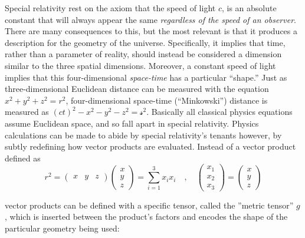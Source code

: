    Special relativity rest on the axiom that the speed of light $c$,
        is an absolute constant that will always appear the same
        \textit{regardless of the speed of an observer}.
    There are many consequences to this, but the most relevant is that
        it produces a description for the geometry of the universe.
    Specifically, it implies that time, rather than a parameter of reality,
        should instead be considered a dimension similar to the three spatial dimensions.
    Moreover, a constant speed of light implies that this four-dimensional \textit{space-time} has a particular ``shape.''
    Just as three-dimensional Euclidean distance can be measured with the equation $x^2+y^2+z^2=r^2$,
        four-dimensional space-time (``Minkowski'') distance is measured as $(ct)^2-x^2-y^2-z^2 = \mathscr{s}^2$.
    Basically all classical physics equations assume Euclidean space, and so fall apart in special relativity.
    Physics calculations can be made to abide by special relativity's tenants however,
        by subtly redefining how vector products are evaluated.
    Instead of a vector product defined as
    \begin{equation}
        r^2 = \begin{pmatrix} x & y & z\end{pmatrix} \begin{pmatrix} x \\ y \\ z \end{pmatrix} = \sum\limits_{i=1}^3 x_i x_i
        \quad , \quad \begin{pmatrix}x_1 \\ x_2 \\ x_3 \end{pmatrix} = \begin{pmatrix} x \\ y \\ z \end{pmatrix} 
    \end{equation}

    vector products can be defined with a specific tensor, called the ''metric tensor'' $g$,
        which is inserted between the product's factors and encodes the shape of the particular geometry being used:

